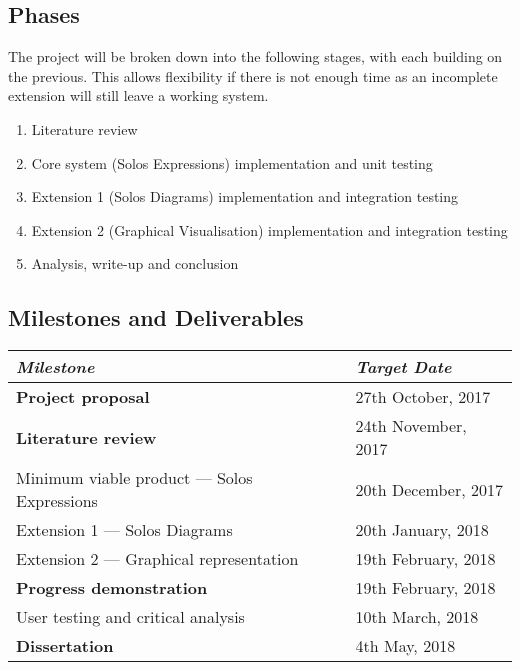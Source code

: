 \documentclass{article}
\begin{document}
\subsection{Phases}
The project will be broken down into the following stages, with each building on the previous. This allows flexibility if there is not enough time as an incomplete extension will still leave a working system.
\begin{enumerate}
	\item Literature review
	\item Core system (Solos Expressions) implementation and unit testing
	\item Extension 1 (Solos Diagrams) implementation and integration testing
	\item Extension 2 (Graphical Visualisation) implementation and integration testing
	\item Analysis, write-up and conclusion
\end{enumerate}

\subsection{Milestones and Deliverables}
\begin{center}
	\begin{tabular}{ l l }
		\toprule
		\textit{Milestone} & \textit{Target Date} \\
		\midrule
		\textbf{Project proposal} & {27th October, 2017} \\
		\textbf{Literature review} & {24th November, 2017} \\
		{Minimum viable product --- Solos Expressions} & {20th December, 2017} \\
		{Extension 1 --- Solos Diagrams} & {20th January, 2018} \\
		{Extension 2 --- Graphical representation} & {19th February, 2018} \\
		\textbf{Progress demonstration} & {19th February, 2018} \\
		{User testing and critical analysis} & {10th March, 2018} \\
		\textbf{Dissertation} & {4th May, 2018} \\
		\bottomrule
	\end{tabular}
\end{center}
\end{document}
